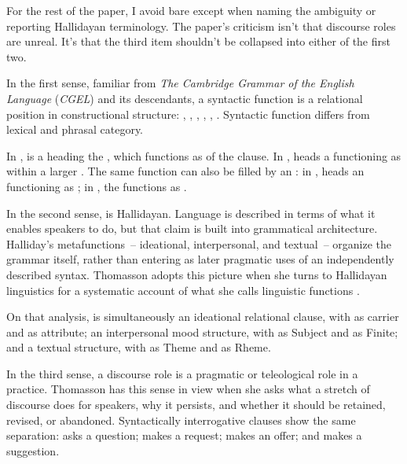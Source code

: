\documentclass[12pt]{article}
\begin{document}
For the rest of the paper, I avoid bare  except when naming the ambiguity or reporting Hallidayan terminology. The paper's criticism isn't that discourse roles are unreal. It's that the third item shouldn't be collapsed into either of the first two.

In the first sense, familiar from \emph{The Cambridge Grammar of the English Language} (\emph{CGEL}) and its descendants, a syntactic function is a relational position in constructional structure: , , , , ,  \citep{huddleston2002}. Syntactic function differs from lexical and phrasal category.

In ,  is a  heading the  , which functions as  of the clause. In ,  heads a  functioning as  within a larger . The same  function can also be filled by an : in ,  heads an  functioning as ; in , the  functions as .

In the second sense,  is Hallidayan. Language is described in terms of what it enables speakers to do, but that claim is built into grammatical architecture. Halliday's metafunctions~-- ideational, interpersonal, and textual~-- organize the grammar itself, rather than entering as later pragmatic uses of an independently described syntax. Thomasson adopts this picture when she turns to Hallidayan linguistics for a systematic account of what she calls linguistic functions \citep[139--159]{thomasson2025rethink}.

On that analysis,  is simultaneously an ideational relational clause, with  as carrier and  as attribute; an interpersonal mood structure, with  as Subject and  as Finite; and a textual structure, with  as Theme and  as Rheme.

In the third sense, a discourse role is a pragmatic or teleological role in a practice. Thomasson has this sense in view when she asks what a stretch of discourse does for speakers, why it persists, and whether it should be retained, revised, or abandoned. Syntactically interrogative clauses show the same separation:  asks a question;  makes a request;  makes an offer; and  makes a suggestion.
\end{document}
